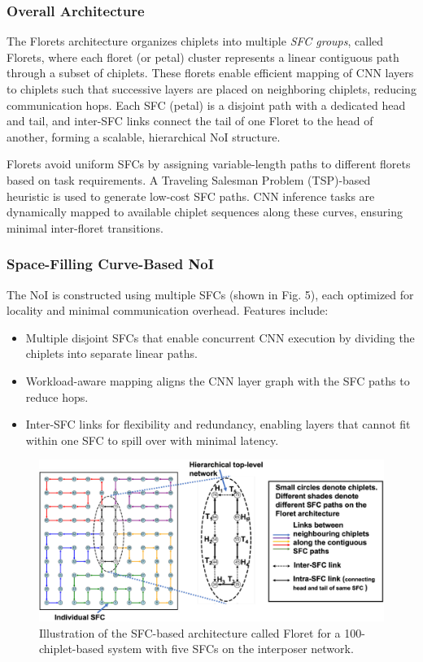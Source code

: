 \documentclass[acmsmall]{acmart}
\begin{document}
\subsubsection{Overall Architecture}
The Florets architecture organizes chiplets into multiple \textit{SFC groups}, called Florets, where each floret (or petal) cluster represents a linear contiguous path through a subset of chiplets. These florets enable efficient mapping of CNN layers to chiplets such that successive layers are placed on neighboring chiplets, reducing communication hops. Each SFC (petal) is a disjoint path with a dedicated head and tail, and inter-SFC links connect the tail of one Floret to the head of another, forming a scalable, hierarchical NoI structure.

Florets avoid uniform SFCs by assigning variable-length paths to different florets based on task requirements. A Traveling Salesman Problem (TSP)-based heuristic is used to generate low-cost SFC paths. CNN inference tasks are dynamically mapped to available chiplet sequences along these curves, ensuring minimal inter-floret transitions.



\subsubsection{Space-Filling Curve-Based NoI}
The NoI is constructed using multiple SFCs (shown in Fig. 5), each optimized for locality and minimal communication overhead. Features include:
\begin{itemize}
    \item Multiple disjoint SFCs that enable concurrent CNN execution by dividing the chiplets into separate linear paths.
    \item Workload-aware mapping aligns the CNN layer graph with the SFC paths to reduce hops.
    \item Inter-SFC links for flexibility and redundancy, enabling layers that cannot fit within one SFC to spill over with minimal latency.
\end{itemize}

\begin{figure}[h]
    \centering
    \includegraphics[width=0.8\linewidth]{figures/florets1.png}
    \caption{Illustration of the SFC-based architecture called Floret for a 100-chiplet-based system with five SFCs
on the interposer network. \cite{florets}}
    \label{fig:florets1}
\end{figure}
\end{document}
